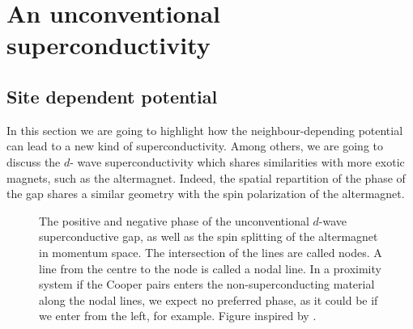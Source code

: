 \documentclass[../main.tex]{subfile}
\begin{document}
\section{An unconventional superconductivity}\label{sec:appendix}
\subsection{Site dependent potential}
In this section we are going to highlight how the neighbour-depending potential can lead to a new kind of superconductivity. Among others, we are going to discuss the $d$-
wave superconductivity which shares similarities with more exotic magnets, such as the altermagnet. 
Indeed, the spatial repartition of the phase of the gap shares a similar geometry with the spin polarization of the altermagnet.
\begin{figure}[H]
    \centering
    \caption{The positive and negative phase of the unconventional $d$-wave superconductive gap, as well as the spin splitting of the altermagnet in momentum space.
    The intersection of the lines are called nodes. A line from the centre to the node is called a nodal line. 
    In a proximity system if the Cooper pairs enters the non-superconducting material 
    along the nodal lines, we expect no preferred phase, as it could be if we enter from the left, for example. Figure inspired by \cite{Smejkal2022}.}
\end{figure}
\end{document}
